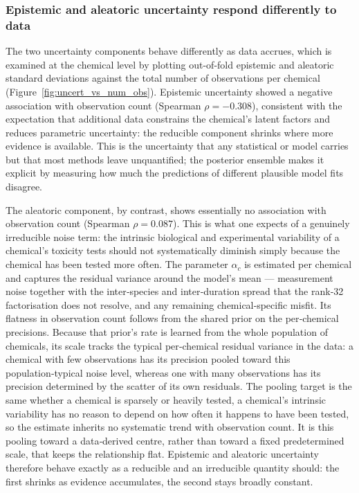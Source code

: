 
\subsubsection{Epistemic and aleatoric uncertainty respond differently to data}

The two uncertainty components behave differently as data accrues, which is examined at the chemical level by plotting out-of-fold epistemic and aleatoric standard deviations against the total number of observations per chemical (Figure~\ref{fig:uncert_vs_num_obs}). Epistemic uncertainty showed a negative association with observation count (Spearman $\rho = -0.308$), consistent with the expectation that additional data constrains the chemical's latent factors and reduces parametric uncertainty: the reducible component shrinks where more evidence is available. This is the uncertainty that any statistical or model carries but that most methods leave unquantified; the posterior ensemble makes it explicit by measuring how much the predictions of different plausible model fits disagree.

The aleatoric component, by contrast, shows essentially no association with observation count (Spearman $\rho = 0.087$). This is what one expects of a genuinely irreducible noise term: the intrinsic biological and experimental variability of a chemical's toxicity tests should not systematically diminish simply because the chemical has been tested more often. The parameter $\alpha_c$ is estimated per chemical and captures the residual variance around the model's mean — measurement noise together with the inter‑species and inter‑duration spread that the rank‑32 factorisation does not resolve, and any remaining chemical‑specific misfit. Its flatness in observation count follows from the shared prior on the per‑chemical precisions. Because that prior's rate is learned from the whole population of chemicals, its scale tracks the typical per‑chemical residual variance in the data: a chemical with few observations has its precision pooled toward this population‑typical noise level, whereas one with many observations has its precision determined by the scatter of its own residuals. The pooling target is the same whether a chemical is sparsely or heavily tested, a chemical's intrinsic variability has no reason to depend on how often it happens to have been tested, so the estimate inherits no systematic trend with observation count. It is this pooling toward a data‑derived centre, rather than toward a fixed predetermined scale, that keeps the relationship flat. Epistemic and aleatoric uncertainty therefore behave exactly as a reducible and an irreducible quantity should: the first shrinks as evidence accumulates, the second stays broadly constant.

